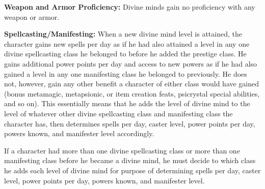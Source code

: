 {
\textbf{Weapon and Armor Proficiency:} Divine minds gain no proficiency with any weapon or armor.

\textbf{Spellcasting/Manifesting:} When a new divine mind level is attained, the character gains new spells per day as if he had also attained a level in any one divine spellcasting class he belonged to before he added the prestige class. He gains additional power points per day and access to new powers as if he had also gained a level in any one manifesting class he belonged to previously. He does not, however, gain any other benefit a character of either class would have gained (bonus metamagic, metapsionic, or item creation feats, psicrystal special abilities, and so on). This essentially means that he adds the level of divine mind to the level of whatever other divine spellcasting class and manifesting class the character has, then determines spells per day, caster level, power points per day, powers known, and manifester level accordingly.

If a character had more than one divine spellcasting class or more than one manifesting class before he became a divine mind, he must decide to which class he adds each level of divine mind for purpose of determining spells per day, caster level, power points per day, powers known, and manifester level.
}